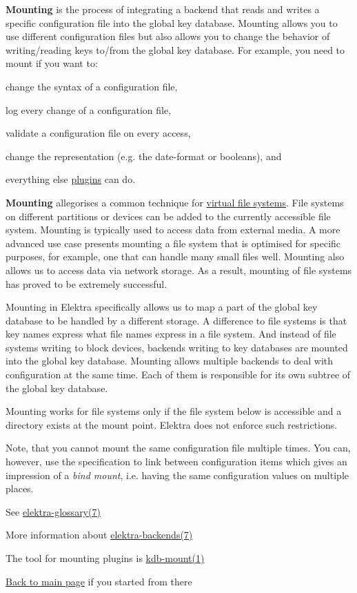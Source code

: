 {\bfseries Mounting} is the process of integrating a backend that reads and writes a specific configuration file into the global key database. Mounting allows you to use different configuration files but also allows you to change the behavior of writing/reading keys to/from the global key database. For example, you need to mount if you want to\+:


\begin{DoxyItemize}
\item change the syntax of a configuration file,
\item log every change of a configuration file,
\item validate a configuration file on every access,
\item change the representation (e.\+g. the date-\/format or booleans), and
\item everything else \hyperlink{src_plugins_README_md}{plugins} can do.
\end{DoxyItemize}

{\bfseries Mounting} allegorises a common technique for \hyperlink{doc_BIGPICTURE_md}{virtual file systems}. File systems on different partitions or devices can be added to the currently accessible file system. Mounting is typically used to access data from external media. A more advanced use case presents mounting a file system that is optimised for specific purposes, for example, one that can handle many small files well. Mounting also allows us to access data via network storage. As a result, mounting of file systems has proved to be extremely successful.

Mounting in Elektra specifically allows us to map a part of the global key database to be handled by a different storage. A difference to file systems is that key names express what file names express in a file system. And instead of file systems writing to block devices, backends writing to key databases are mounted into the global key database. Mounting allows multiple backends to deal with configuration at the same time. Each of them is responsible for its own subtree of the global key database.

Mounting works for file systems only if the file system below is accessible and a directory exists at the mount point. Elektra does not enforce such restrictions.

Note, that you cannot mount the same configuration file multiple times. You can, however, use the specification to link between configuration items which gives an impression of a {\itshape bind mount}, i.\+e. having the same configuration values on multiple places.


\begin{DoxyItemize}
\item See \hyperlink{doc_help_elektra-glossary_md}{elektra-\/glossary(7)}
\item More information about \hyperlink{doc_help_elektra-backends_md}{elektra-\/backends(7)}
\item The tool for mounting plugins is \hyperlink{doc_help_kdb-mount_md}{kdb-\/mount(1)}
\item \hyperlink{README_md}{Back to main page} if you started from there 
\end{DoxyItemize}